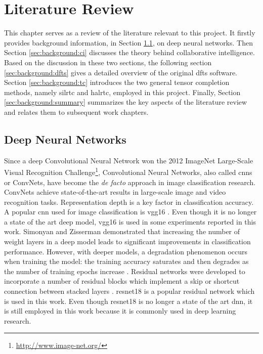\chapter{Literature Review} \label{chapter:background}
This chapter serves as a review of the literature relevant to this project. It firstly provides background information, in Section \ref{sec:background:dnn}, on deep neural networks. Then Section \ref{sec:background:ci} discusses the theory behind collaborative intelligence. Based on the discussion in these two sections, the following section \ref{sec:background:dfts} gives a detailed overview of the original \gls{dfts} software. Section \ref{sec:background:tc} introduces the two general tensor completion methods, namely \gls{silrtc} and \gls{halrtc}, employed in this project. Finally, Section \ref{sec:background:summary} summarizes the key aspects of the literature review and relates them to subsequent work chapters.

\section{Deep Neural Networks} \label{sec:background:dnn}
Since a deep Convolutional Neural Network \cite{KrizhevskySH12} won the 2012 ImageNet Large-Scale Visual Recognition Challenge\footnote{\url{http://www.image-net.org/}}, Convolutional Neural Networks, also called \gls{cnn}s or ConvNets, have become the \textit{de facto} approach in image classification research. ConvNets achieve state-of-the-art results in large-scale image and video recognition tasks. Representation depth is a key factor in classification accuracy. A popular \gls{cnn} used for image classification is \gls{vgg16} \cite{vgg16}. Even though it is no longer a state of the art deep model, \gls{vgg16} is used in some experiments reported in this work. Simonyan and Zisserman \cite{vgg16} demonstrated that increasing the number of weight layers in a deep model leads to significant improvements in classification performance. However, with deeper models, a degradation phenomenon occurs when training the model: the training accuracy saturates and then degrades as the number of training epochs increase \cite{he2016deep}. Residual networks were developed to incorporate a number of residual blocks which implement a skip or shortcut connection between stacked layers \cite{he2016deep}. \gls{resnet18} is a popular residual network which is used in this work. Even though \gls{resnet18} is no longer a state of the art \gls{dnn}, it is still employed in this work because it is commonly used in deep learning research.

